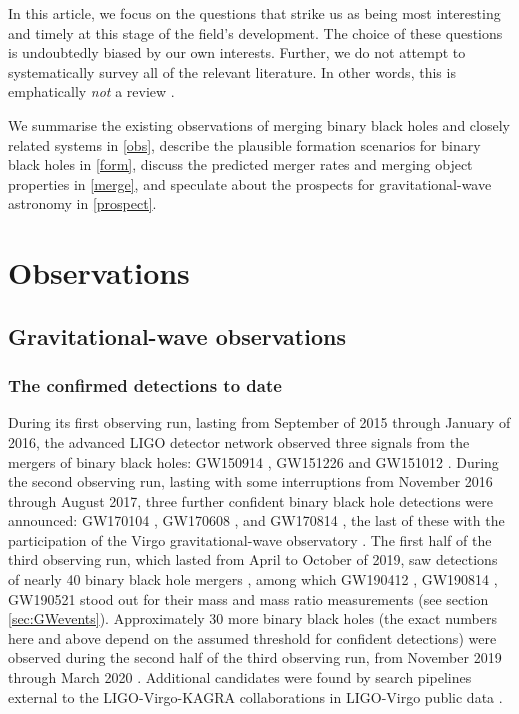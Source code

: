 \documentclass[review]{elsarticle}
\begin{document}
In this article, we focus on the questions that strike us as being most interesting and timely at this stage of the field's development.  The choice of these questions is undoubtedly biased by our own interests. Further, we do not attempt to systematically survey all of the relevant literature.  In other words, this is emphatically {\it not} a review \citep{magritte}. 

We summarise the existing observations of merging binary black holes and closely related systems in \autoref{obs}, describe the plausible formation scenarios for binary black holes in \autoref{form}, discuss the predicted merger rates and merging object properties in \autoref{merge}, and speculate about the prospects for gravitational-wave astronomy in \autoref{prospect}.


 

\section{Observations}\label{obs}

\subsection{Gravitational-wave observations}


\subsubsection{The confirmed detections to date}
During its first observing run, lasting from September of 2015 through January of 2016, the advanced LIGO detector network observed three signals from the mergers of binary black holes:  GW150914 \citep{GW150914}, GW151226 \citep{GW151226} and GW151012 \citep{GW150914:rates,BBH:O1}.  During the second observing run, lasting with some interruptions from November 2016 through August 2017, three further confident binary black hole detections were announced: GW170104 \citep{GW170104},  GW170608 \citep{GW170608}, and GW170814 \citep{GW170814}, the last of these with the participation of the Virgo gravitational-wave observatory \citep{AdvVirgo}.  The first half of the third observing run, which lasted from April to October of 2019, saw detections of nearly 40 binary black hole mergers \citep{GWTC2,Abbott:2021-GWTC-2-1}, among which GW190412 \citep{GW190412}, GW190814 \citep{GW190814}, GW190521 \citep{GW190521} stood out for their mass and mass ratio measurements (see section \ref{sec:GWevents}).  Approximately 30 more binary black holes (the exact numbers here and above depend on the assumed threshold for confident detections) were observed during the second half of the third observing run, from November 2019 through March 2020 \citep{GWTC3}.  Additional candidates were found by search pipelines external to the LIGO-Virgo-KAGRA collaborations in LIGO-Virgo public data \citep{Nitz:2019,Nitz:2021,Venumadhav:2019,Venumadhav:2020,Nitz:2021-4OGC,Olsen:2022}.  
\end{document}
